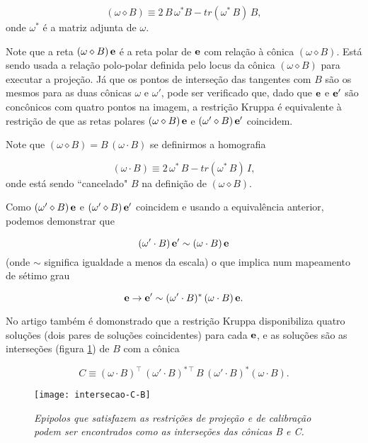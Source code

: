 \begin{equation}
(\omega \diamond B)\equiv 2\,B\,\omega^*B - tr(\omega^*\,B)\,B,
\end{equation}
onde $\omega^*$ é a matriz adjunta de $\omega$.

Note que a reta $(\omega \diamond B)\,{\bf e}$ é a reta polar de ${\bf e}$ com relação à cônica $(\omega \diamond B)$. Está sendo usada a relação polo-polar definida pelo locus da cônica $(\omega \diamond B)$ para executar a projeção. Já que os pontos de interseção das tangentes com $B$ são os mesmos para as duas cônicas $\omega$ e $\omega'$, pode ser verificado que, dado que ${\bf e}$ e ${\bf e'}$ são concônicos com quatro pontos na imagem, a restrição Kruppa é equivalente à restrição de que as retas polares $(\omega \diamond B)\,{\bf e}$ e $(\omega' \diamond B)\,{\bf e'}$ coincidem.


Note que $(\omega \diamond B) = B\,(\omega \cdot B)$ se definirmos a homografia

\begin{equation}
(\omega \cdot B) \equiv 2\,\omega^*\,B - tr(\omega^*\,B)\,I,
\end{equation}
onde está sendo ``cancelado" $B$ na definição de $(\omega \diamond B)$. 


Como $(\omega' \diamond B)\,{\bf e}$ e $(\omega' \diamond B)\,{\bf e'}$ coincidem e usando a equivalência anterior, podemos demonstrar que 

\begin{equation}
(\omega' \cdot B)\,{\bf e'} \sim (\omega \cdot B)\,{\bf e}
\end{equation} 
(onde $\sim$ significa igualdade a menos da escala) o que implica num mapeamento de sétimo grau 

\begin{equation}
{\bf e} \rightarrow {\bf e'} \sim (\omega' \cdot B)^*\,(\omega \cdot B)\,{\bf e}.
\label{funcao-de-e}
\end{equation}

No artigo também é domonstrado que a restrição Kruppa disponibiliza quatro soluções (dois pares de soluções coincidentes) para cada ${\bf e}$, e as soluções são as interseções (figura \ref{inter-B-C}) de $B$ com a cônica 

\begin{equation}
C \equiv (\omega \cdot B)^\top\,(\omega' \cdot B)^{*\,\top}\,B\,(\omega' \cdot B)^*(\omega \cdot B).
\end{equation}

\begin{figure}[!htb]
\centering
\texttt{[image: intersecao-C-B]}
\caption{\textit{Epipolos que satisfazem as restrições de projeção e de calibração podem ser encontrados como as interseções das cônicas B e C.}}
\label{inter-B-C}
\end{figure}


